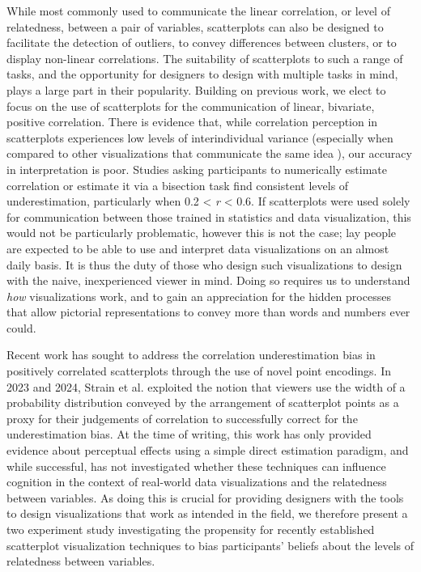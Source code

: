 \documentclass[manuscript,screen,review,anonymous]{acmart}
\begin{document}
While most commonly used to communicate the linear correlation, or level
of relatedness, between a pair of variables, scatterplots can also be
designed to facilitate the detection of outliers, to convey differences
between clusters, or to display non-linear correlations. The suitability
of scatterplots to such a range of tasks, and the opportunity for
designers to design with multiple tasks in mind, plays a large part in
their popularity. Building on previous work, we elect to focus on the
use of scatterplots for the communication of linear, bivariate, positive
correlation. There is evidence that, while correlation perception in
scatterplots experiences low levels of interindividual variance
(especially when compared to other visualizations that communicate the
same idea \citep{harrison_2014, kay_2015}), our accuracy in
interpretation is poor. Studies asking participants to numerically
estimate correlation
\citep{strahan_1978, bobko_1979, cleveland_1982, lane_1985, lauer_1989, collyer_1990, meyer_1992}
or estimate it via a bisection task \citep{rensink_2017} find consistent
levels of underestimation, particularly when 0.2 \textless{} \emph{r}
\textless{} 0.6. If scatterplots were used solely for communication
between those trained in statistics and data visualization, this would
not be particularly problematic, however this is not the case; lay
people are expected to be able to use and interpret data visualizations
on an almost daily basis. It is thus the duty of those who design such
visualizations to design with the naive, inexperienced viewer in mind.
Doing so requires us to understand \emph{how} visualizations work, and
to gain an appreciation for the hidden processes that allow pictorial
representations to convey more than words and numbers ever could.

Recent work has sought to address the correlation underestimation bias
in positively correlated scatterplots through the use of novel point
encodings. In 2023 and 2024, Strain et al.
\citep{strain_2023, strain_2023b, strain_2024} exploited the notion that
viewers use the width of a probability distribution conveyed by the
arrangement of scatterplot points as a proxy for their judgements of
correlation to successfully correct for the underestimation bias. At the
time of writing, this work has only provided evidence about perceptual
effects using a simple direct estimation paradigm, and while successful,
has not investigated whether these techniques can influence cognition in
the context of real-world data visualizations and the relatedness
between variables. As doing this is crucial for providing designers with
the tools to design visualizations that work as intended in the field,
we therefore present a two experiment study investigating the propensity
for recently established scatterplot visualization techniques to bias
participants' beliefs about the levels of relatedness between variables.
\end{document}

